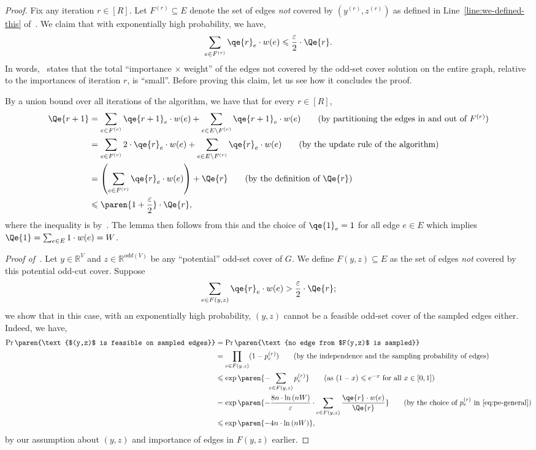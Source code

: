 \documentclass{article}
\renewcommand{\leq}{\leqslant}
\DeclarePairedDelimiter{\paren}()
\newcommand{\eps}{\varepsilon}
\newcommand{\IR}{\mathbb{R}}
\begin{document}
\begin{proof}
	Fix any iteration $r \in [R]$. Let $F^{(r)} \subseteq E$ denote the set of edges \emph{not} covered by $(y^{(r)},z^{(r)})$ as defined in Line~\eqref{line:we-defined-this} of~. We claim that with exponentially high probability, we have, 
	\begin{align}
		\sum_{e \in F^{(r)}} \qe{r}_e \cdot w(e) \leq \frac{\eps}{2} \cdot \Qe{r}. \label{eq:clm1-general}
	\end{align}
	In words,~ states that the total ``importance $\times$ weight'' of the edges {not} covered by the odd-set cover solution on the entire graph, relative to the importances of iteration $r$, is ``small''. Before proving this claim, let us see how it concludes the proof. 
	
	By a union bound over all iterations of the algorithm, we have that for every $r \in [R]$, 
	\begin{align*}
		\Qe{r+1} &= \sum_{e \in F^{(r)}} \qe{r+1}_e \cdot w(e) + \sum_{e \in E \setminus F^{(r)}} \qe{r+1}_e \cdot w(e) \tag{by partitioning the edges in and out of $F^{(r)}$} \\
		&= \sum_{e \in F^{(r)}} 2 \cdot \qe{r}_e \cdot w(e) + \sum_{e \in E \setminus F^{(r)}} \qe{r}_e \cdot w(e) \tag{by the update rule of the algorithm} \\
		&= \left({\sum_{e \in F^{(r)}} \qe{r}_e \cdot w(e)}\right) + \Qe{r} \tag{by the definition of $\Qe{r}$} \\
		&\leq \paren{1+\frac{\eps}{2}} \cdot \Qe{r},
	\end{align*}
	where the inequality is by~. The lemma then follows from this and the choice of $\qe{1}_e=1$ for all edge $e \in E$ which implies $\Qe{1} = \sum_{e \in E} 1 \cdot w(e) = W$. 
	
	\noindent
	\emph{Proof of~.} Let $y \in \IR^V$ and $z \in \IR^{odd(V)}$ be any ``potential'' odd-set cover of $G$. 
	We define $F(y,z) \subseteq E$ as the set of edges \emph{not} covered by this potential odd-cut cover. 
	Suppose 
	\[
		\sum_{e \in F(y,z)} \qe{r}_e \cdot w(e) > \frac{\eps}{2} \cdot \Qe{r};
	\]
	we show that in this case, with an exponentially high probability, $(y,z)$ cannot be a feasible odd-set cover  of the sampled edges either. Indeed, we have, 
	\begin{align*}
		\Pr\paren{\text{$(y,z)$ is feasible on sampled edges}} &= \Pr\paren{\text{no edge from $F(y,z)$ is sampled}} \\
		&= \prod_{e \in F(y,z)} (1-p^{(r)}_e) \tag{by the independence and the sampling probability of edges} \\
		&\leq \exp\paren{-\!\!\sum_{e \in F(y,z)} p^{(r)}_e} \tag{as $(1-x) \leq e^{-x}$ for all $x \in [0,1]$} \\
		&= \exp\paren{-\frac{8n \cdot \ln{(nW)}}{\eps} \cdot \sum_{e \in F(y,z)} \frac{\qe{r} \cdot w(e)}{\Qe{r}}} \tag{by the choice of $p^{(r)}_e$ in~\Cref{eq:pe-general}} \\
		&\leq \exp\paren{-4n \cdot \ln{(nW)}},
	\end{align*}
	by our assumption about $(y,z)$ and importance of edges in $F(y,z)$ earlier. 


\end{proof}
\end{document}
